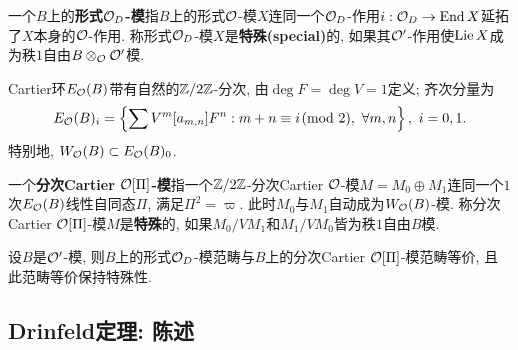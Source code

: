 \begin{definition}
    一个$B$上的\textbf{形式$\mathcal{O}_D$-模}指$B$上的形式$\mathcal{O}$-模$X$连同一个$\mathcal{O}_D$-作用$i : \mathcal{O}_D\to\operatorname{End} X$延拓了$X$本身的$\mathcal{O}$-作用.
    称形式$\mathcal{O}_D$-模$X$是\textbf{特殊(special)}的, 如果其$\mathcal{O}'$-作用使$\operatorname{Lie} X$成为秩$1$自由$B\otimes_{\mathcal{O}}\mathcal{O}'$模.
\end{definition}

Cartier环$E_{\mathcal{O}}(B)$带有自然的$\mathbb{Z}/2\mathbb{Z}$-分次, 由$\deg F = \deg V = 1$定义;
齐次分量为\begin{align*}
    E_{\mathcal{O}}(B)_i = \left\{ \sum V^m[a_{m, n}]F^n : m + n\equiv i\!\!\pmod 2,\ \forall m, n \right\},\ i = 0, 1.
\end{align*}
特别地, $W_{\mathcal{O}}(B)\subset E_{\mathcal{O}}(B)_0$.

\begin{definition}
    一个\textbf{分次Cartier $\mathcal{O}[\Pi]$-模}指一个$\mathbb{Z}/2\mathbb{Z}$-分次Cartier $\mathcal{O}$-模$M = M_0\oplus M_1$连同一个$1$次$E_{\mathcal{O}}(B)$线性自同态$\Pi$,
    满足$\Pi^2 = \varpi$. 此时$M_0$与$M_1$自动成为$W_{\mathcal{O}}(B)$-模. 称分次Cartier $\mathcal{O}[\Pi]$-模$M$是\textbf{特殊}的, 如果$M_0/VM_1$和$M_1/VM_0$皆为秩$1$自由$B$模.
\end{definition}

\begin{theorem}
    \cite[II, 2.3]{BC91}
    设$B$是$\mathcal{O}'$-模,
    则$B$上的形式$\mathcal{O}_D$-模范畴与$B$上的分次Cartier $\mathcal{O}[\Pi]$-模范畴等价, 且此范畴等价保持特殊性.
\end{theorem}

    

\subsection{Drinfeld定理: 陈述}


